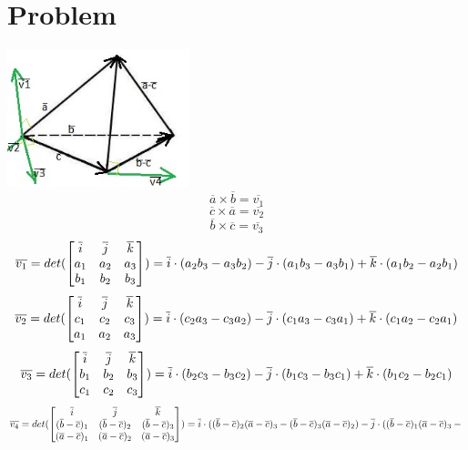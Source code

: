 \documentclass[11pt]{article}
\begin{document}
    \section{Problem}
    \includegraphics[width=200px]{tetr.png}
    \[\overline{a}\times\overline{b}=\overline{v_1} \]
    \[\overline{c}\times\overline{a}=\overline{v_2} \]
    \[\overline{b}\times\overline{c}=\overline{v_3} \]
    \[\overline{v_1}=det(\begin{bmatrix}
                           \overline{i} & \overline{j} & \overline{k}\\
                           a_1 & a_2 & a_3 \\
                           b_1 & b_2 & b_3
    \end{bmatrix}) = \overline{i}\cdot(a_2b_3 - a_3b_2)-\overline{j}\cdot(a_1b_3 - a_3b_1) + \overline{k} \cdot(a_1b_2-a_2b_1) \newline \]
    \[\overline{v_2}=det(\begin{bmatrix}
                           \overline{i} & \overline{j} & \overline{k}\\
                           c_1 & c_2 & c_3 \\
                           a_1 & a_2 & a_3
    \end{bmatrix}) = \overline{i}\cdot(c_2a_3 - c_3a_2)-\overline{j}\cdot(c_1a_3 - c_3a_1) + \overline{k} \cdot(c_1a_2-c_2a_1) \newline \]
    \[\overline{v_3}=det(\begin{bmatrix}
                           \overline{i} & \overline{j} & \overline{k}\\
                           b_1 & b_2 & b_3 \\
                           c_1 & c_2 & c_3
    \end{bmatrix}) = \overline{i}\cdot(b_2c_3 - b_3c_2)-\overline{j}\cdot(b_1c_3 - b_3c_1) + \overline{k} \cdot(b_1c_2-b_2c_1) \newline \]
    \[\overline{v_4}=det(\begin{bmatrix}
                           \overline{i} & \overline{j} & \overline{k}\\
                           (\overline{b}-\overline{c})_1 & (\overline{b}-\overline{c})_2 & (\overline{b}-\overline{c})_3 \\
                           (\overline{a}-\overline{c})_1 & (\overline{a}-\overline{c})_2 & (\overline{a}-\overline{c})_3
    \end{bmatrix}) = \overline{i}\cdot((\overline{b}-\overline{c})_2(\overline{a}-\overline{c})_3 - (\overline{b}-\overline{c})_3(\overline{a}-\overline{c})_2)-\overline{j}\cdot((\overline{b}-\overline{c})_1(\overline{a}-\overline{c})_3 - \newline \]
\end{document}
